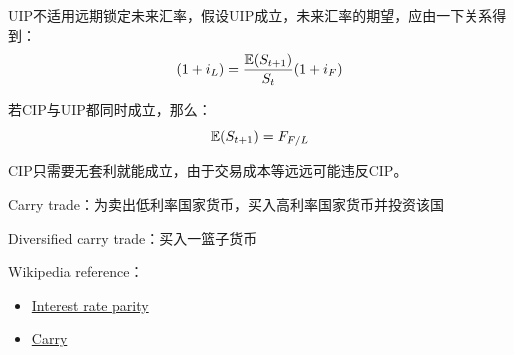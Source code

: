 \documentclass[11pt]{article}
\begin{document}
\begin{appendices}
UIP不适用远期锁定未来汇率，假设UIP成立，未来汇率的期望，应由一下关系得到：
\begin{equation*}
    (1 + i_{L}) = \frac{\mathbb{E}(S_{t+1})}{S_t} (1+ i_{F})
\end{equation*}

若CIP与UIP都同时成立，那么：
\begin{equation*}
    \mathbb{E} (S_{t+1}) = F_{F/L}
\end{equation*}

CIP只需要无套利就能成立，由于交易成本等远远可能违反CIP。


Carry trade：为卖出低利率国家货币，买入高利率国家货币并投资该国

Diversified carry trade：买入一篮子货币


Wikipedia reference：
\begin{itemize}
    \item \href{https://en.wikipedia.org/wiki/Interest_rate_parity}{Interest rate parity}
    \item \href{https://en.wikipedia.org/wiki/Carry_(investment)#Currency}{Carry}
\end{itemize}

\end{appendices}
\end{document}
